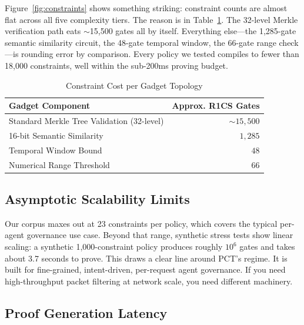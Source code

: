 \documentclass[10pt,conference]{IEEEtran}
\begin{document}
Figure~\ref{fig:constraints} shows something striking: constraint counts are almost flat across all five complexity tiers. The reason is in Table~\ref{tab:gadgets}. The 32-level Merkle verification path eats $\sim$15,500 gates all by itself. Everything else---the 1,285-gate semantic similarity circuit, the 48-gate temporal window, the 66-gate range check---is rounding error by comparison. Every policy we tested compiles to fewer than 18,000 constraints, well within the sub-200ms proving budget.

\begin{table}[h]
\centering
\caption{Constraint Cost per Gadget Topology}
\label{tab:gadgets}
\begin{tabular}{@{}lr@{}}
\toprule
\textbf{Gadget Component} & \textbf{Approx. R1CS Gates} \\
\midrule
Standard Merkle Tree Validation (32-level) & $\sim 15,500$ \\
16-bit Semantic Similarity & $1,285$ \\
Temporal Window Bound & $48$ \\
Numerical Range Threshold & $66$ \\
\bottomrule
\end{tabular}
\end{table}

\subsection{Asymptotic Scalability Limits}

Our corpus maxes out at 23 constraints per policy, which covers the typical per-agent governance use case. Beyond that range, synthetic stress tests show linear scaling: a synthetic 1,000-constraint policy produces roughly $10^6$ gates and takes about 3.7 seconds to prove. This draws a clear line around PCT's regime. It is built for fine-grained, intent-driven, per-request agent governance. If you need high-throughput packet filtering at network scale, you need different machinery.

\subsection{Proof Generation Latency}
\end{document}
